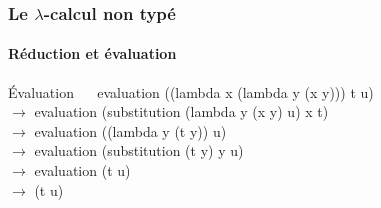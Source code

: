 \documentclass{beamer}
\begin{document}
\begin{frame}
\frametitle{Le $\lambda$-calcul non typé}
\framesubtitle{Réduction et évaluation}

\begin{block}{Évaluation}
    $\:\:\:\:\:\:$evaluation ((lambda x (lambda y (x y))) t u) \\
    $\rightarrow$ evaluation (substitution (lambda y (x y) u) x t) \\
    $\rightarrow$ evaluation ((lambda y (t y)) u) \\
    $\rightarrow$ evaluation (substitution (t y) y u) \\
    $\rightarrow$ evaluation (t u) \\
    $\rightarrow$ (t u)
\end{block}

\end{frame}
\end{document}
